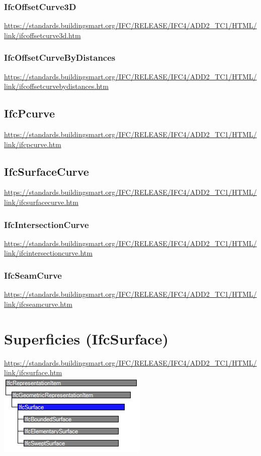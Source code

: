 \documentclass[spanish,12pt,a4paper,final,oneside]{book}
\begin{document}
\subsubsection{IfcOffsetCurve3D}
\url{https://standards.buildingsmart.org/IFC/RELEASE/IFC4/ADD2_TC1/HTML/link/ifcoffsetcurve3d.htm}

\subsubsection{IfcOffsetCurveByDistances}
\url{https://standards.buildingsmart.org/IFC/RELEASE/IFC4/ADD2_TC1/HTML/link/ifcoffsetcurvebydistances.htm}


\subsection{IfcPcurve}
\url{https://standards.buildingsmart.org/IFC/RELEASE/IFC4/ADD2_TC1/HTML/link/ifcpcurve.htm}


\subsection{IfcSurfaceCurve}
\url{https://standards.buildingsmart.org/IFC/RELEASE/IFC4/ADD2_TC1/HTML/link/ifcsurfacecurve.htm}

\subsubsection{IfcIntersectionCurve}
\url{https://standards.buildingsmart.org/IFC/RELEASE/IFC4/ADD2_TC1/HTML/link/ifcintersectioncurve.htm}

\subsubsection{IfcSeamCurve}
\url{https://standards.buildingsmart.org/IFC/RELEASE/IFC4/ADD2_TC1/HTML/link/ifcseamcurve.htm}



\section{Superficies (IfcSurface)}
\url{https://standards.buildingsmart.org/IFC/RELEASE/IFC4/ADD2_TC1/HTML/link/ifcsurface.htm}
\\ \includegraphics[scale=1]{jerarquia de IfcSurface}
\end{document}
